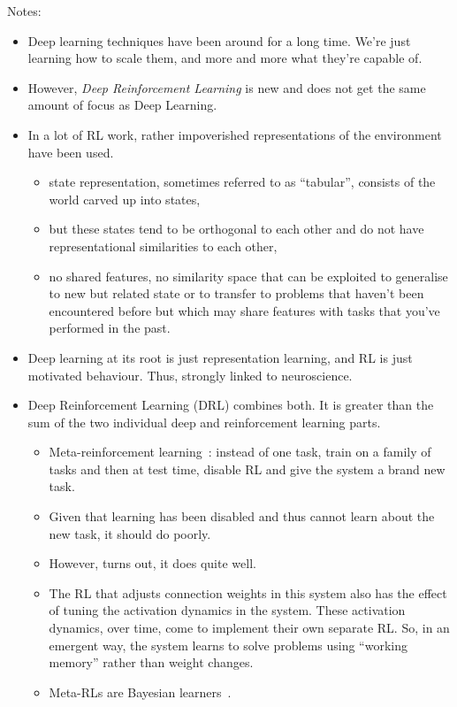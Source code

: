 \documentclass[11pt,a4paper,twoside]{article}
\begin{document}
Notes:
\begin{itemize}
  \item Deep learning techniques have been around for a long time. We're just learning how to scale them, and more and more what they're capable of.
  \item However, \emph{Deep Reinforcement Learning} is new and does not get the same amount of focus as Deep Learning.
  \item In a lot of RL work, rather impoverished representations of the environment have been used.
    \begin{itemize}
      \item state representation, sometimes referred to as \enquote{tabular}, consists of the world carved up into states,
      \item but these states tend to be orthogonal to each other and do not have representational similarities to each other,
      \item no shared features, no similarity space that can be exploited to generalise to new but related state or to transfer to problems that haven't been encountered before but which may share features with tasks that you've performed in the past.
    \end{itemize}
  \item Deep learning at its root is just representation learning, and RL is just motivated behaviour. Thus, strongly linked to neuroscience.
  \item Deep Reinforcement Learning (DRL) combines both. It is greater than the sum of the two individual deep and reinforcement learning parts.
    \begin{itemize}
      \item Meta-reinforcement learning~\autocite{Wang2018}: instead of one task, train on a family of tasks and then at test time, disable RL and give the system a brand new task.
      \item Given that learning has been disabled and thus cannot learn about the new task, it should do poorly.
      \item However, turns out, it does quite well.
      \item The RL that adjusts connection weights in this system also has the effect of tuning the activation dynamics in the system. These activation dynamics, over time, come to implement their own separate RL\@. So, in an emergent way, the system learns to solve problems using \enquote{working memory} rather than weight changes.
      \item Meta-RLs are Bayesian learners~\autocite{Ortega2019}.

\end{itemize}
\end{itemize}
\end{document}
